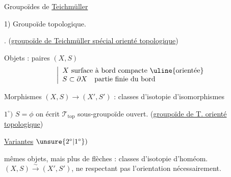 Groupoïdes de \uline{Teichmüller}

1) Groupoïde topologique. .
(\uline{groupoïde de Teichmüller spécial orienté topologique})

Objets : paires $(X,S)$
\[
\left|\begin{array}{l}
X\ \text{surface à bord compacte \uline{orientée}}\\
S\subset\partial X\quad\text{partie finie du bord}
\end{array}\right.
\]

Morphismes $(X,S)\longrightarrow(X',S')$ : classes d'isotopie d'isomorphismes

$1^\circ)$ $S=\phi$ on écrit $\mathcal T_{\mathrm{top}}$ sous-groupoïde ouvert.
(\uline{groupoïde de T.  orienté topologique})

 \uline{Variantes}
$\unsure{2^\circ|1^\circ})$  mêmes objets, mais plus de flèches :
classes d'isotopie d'homéom. $(X,S)\xrightarrow{\sim}(X',S')$, ne respectant pas l'orientation nécessairement.

